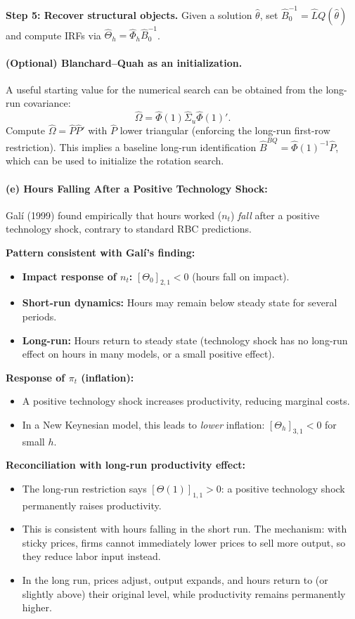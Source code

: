 \documentclass[12pt]{article}
\theoremstyle{definition}
\begin{document}
\noindent \textbf{Step 5: Recover structural objects.}
Given a solution $\hat{\theta}$, set $\hat B_0^{-1}=\hat LQ(\hat{\theta})$ and compute IRFs via $\hat{\Theta}_h=\hat{\Phi}_h\hat B_0^{-1}$.

\paragraph{(Optional) Blanchard--Quah as an initialization.} A useful starting value for the numerical search can be obtained from the long-run covariance:
\[
\hat{\Omega}=\hat{\Phi}(1)\hat{\Sigma}_u\hat{\Phi}(1)'.
\]
Compute $\hat{\Omega}=\hat P\hat P'$ with $\hat P$ lower triangular (enforcing the long-run first-row restriction). This implies a baseline long-run identification $\hat B^{BQ}=\hat{\Phi}(1)^{-1}\hat P$, which can be used to initialize the rotation search.

\bigskip
\paragraph{(e) Hours Falling After a Positive Technology Shock:} Galí (1999) found empirically that hours worked ($n_t$) \emph{fall} after a positive technology shock, contrary to standard RBC predictions.

\textbf{Pattern consistent with Galí's finding:}
\begin{itemize}
    \item \textbf{Impact response of $n_t$:} $[\Theta_0]_{2,1} < 0$ (hours fall on impact).
    \item \textbf{Short-run dynamics:} Hours may remain below steady state for several periods.
    \item \textbf{Long-run:} Hours return to steady state (technology shock has no long-run effect on hours in many models, or a small positive effect).
\end{itemize}

\textbf{Response of $\pi_t$ (inflation):}
\begin{itemize}
    \item A positive technology shock increases productivity, reducing marginal costs.
    \item In a New Keynesian model, this leads to \emph{lower} inflation: $[\Theta_h]_{3,1} < 0$ for small $h$.
\end{itemize}

\textbf{Reconciliation with long-run productivity effect:}
\begin{itemize}
    \item The long-run restriction says $[\Theta(1)]_{1,1} > 0$: a positive technology shock permanently raises productivity.
    \item This is consistent with hours falling in the short run. The mechanism: with sticky prices, firms cannot immediately lower prices to sell more output, so they reduce labor input instead.
    \item In the long run, prices adjust, output expands, and hours return to (or slightly above) their original level, while productivity remains permanently higher.
\end{itemize}
\end{document}
